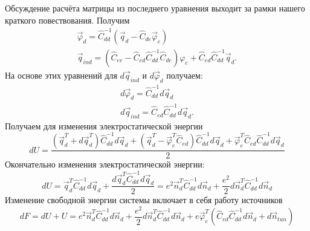 \documentclass[12pt,a4paper]{report}
\begin{document}
Обсуждение расчёта матрицы из последнего уравнения выходит за рамки нашего краткого повествования. Получим
\begin{equation}
  \begin{array}{l}
   \vec \varphi_d=\hat C^{-1}_{dd}
   (\vec{q}_d-\hat C_{de}\vec \varphi_e)\\
   \vec q_{ind}=(\hat C_{ee}-\hat C_{ed}\hat C^{-1}_{dd}\hat C_{de})\varphi_e+
   \hat C_{ed}\hat C^{-1}_{dd}\vec q_d.
  \end{array}
\end{equation}
На основе этих уравнений для $d\vec q_{ind}$ и 
$d\vec{\varphi}_d$ получаем:
\begin{equation}
  \begin{array}{l}
   d\vec \varphi_d=\hat C^{-1}_{dd}d\vec{q}_d\\
   d\vec q_{ind}=
   \hat C_{ed}\hat C^{-1}_{dd}d\vec q_d.
  \end{array}
\end{equation}
Получаем для изменения электростатической энергии
\begin{equation}
  dU = 
  \frac{(\vec{q}^T_d+d\vec{q}^T_d)\hat C^{-1}_{dd}d\vec{q}_d+
  (\vec{q}_d^T-\vec \varphi_e^T\hat C_{ed})\hat C^{-1}_{dd}d\vec{q}_d+
  \vec{\varphi}_e^T\hat C_{ed}\hat C^{-1}_{dd}d\vec q_d}{2}
\end{equation}
Окончательно изменения электростатической энергии:
\begin{equation}
  dU = \vec{q}^T_d\hat C^{-1}_{dd}d\vec{q}_d+
  \frac{d\vec{q}^T_d\hat C^{-1}_{dd}d\vec{q}_d}{2}=
  e^2\vec{n}^T_d\hat C^{-1}_{dd}d\vec{n}_d+
  \frac{e^2}{2}d\vec{n}^T_d\hat C^{-1}_{dd}d\vec{n}_d
\end{equation}
Изменение свободной энергии системы включает в себя работу источников
\begin{equation}\label{eq1}
 dF=dU + U=e^2\vec{n}^T_d\hat C^{-1}_{dd}d\vec{n}_d+
  \frac{e^2}{2}d\vec{n}^T_d\hat C^{-1}_{dd}d\vec{n}_d+
  e\vec \varphi_e^T(\hat C_{ed}\hat C^{-1}_{dd}d\vec{n}_d+d\vec{n}_{tun})
\end{equation}
\end{document}

